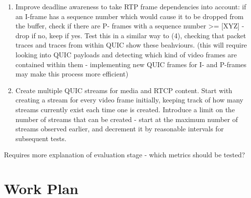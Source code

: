 \documentclass{mprop}
\begin{document}
\begin{enumerate}
  \item Improve deadline awareness to take RTP frame dependencies into account: if an I-frame has 
  a sequence number which would cause it to be dropped from the buffer, check if there are P-
  frames with a sequence number >= [XYZ] - drop if no, keep if yes. Test this in a similar way to 
  (4), checking that packet traces and traces from within QUIC show these beahviours. (this will 
  require looking into QUIC payloads and detecting which kind of video frames are contained 
  within them - implementing new QUIC frames for I- and P-frames may make this process more 
  efficient)

  \item Create multiple QUIC streams for media and RTCP content. Start with creating a stream for 
  every video frame initially, keeping track of how many streams currently exist each time one is 
  created. Introduce a limit on the number of streams that can be created - start at the maximum 
  number of streams observed earlier, and decrement it by reasonable intervals for subsequent 
  tests.
\end{enumerate}

Requires more explanation of evaluation stage - which metrics should be tested?

\newpage

\section{Work Plan}

\end{document}
